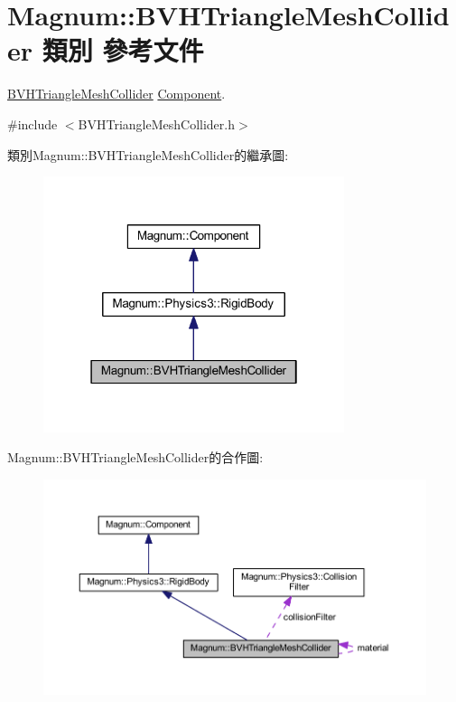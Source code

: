 \hypertarget{class_magnum_1_1_b_v_h_triangle_mesh_collider}{}\section{Magnum\+:\+:B\+V\+H\+Triangle\+Mesh\+Collider 類別 參考文件}
\label{class_magnum_1_1_b_v_h_triangle_mesh_collider}


\hyperlink{class_magnum_1_1_b_v_h_triangle_mesh_collider}{B\+V\+H\+Triangle\+Mesh\+Collider} \hyperlink{class_magnum_1_1_component}{Component}.  




{\ttfamily \#include $<$B\+V\+H\+Triangle\+Mesh\+Collider.\+h$>$}



類別\+Magnum\+:\+:B\+V\+H\+Triangle\+Mesh\+Collider的繼承圖\+:\nopagebreak
\begin{figure}[H]
\begin{center}
\leavevmode
\includegraphics[width=250pt]{class_magnum_1_1_b_v_h_triangle_mesh_collider__inherit__graph}
\end{center}
\end{figure}


Magnum\+:\+:B\+V\+H\+Triangle\+Mesh\+Collider的合作圖\+:\nopagebreak
\begin{figure}[H]
\begin{center}
\leavevmode
\includegraphics[width=350pt]{class_magnum_1_1_b_v_h_triangle_mesh_collider__coll__graph}
\end{center}
\end{figure}
